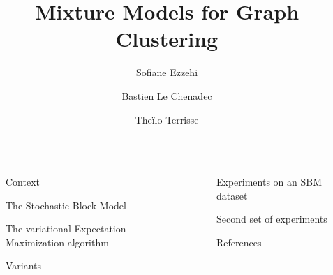 \documentclass[final]{beamer}
\title{Mixture Models for Graph Clustering}
\author{Sofiane Ezzehi \inst{1} \and Bastien Le Chenadec \inst{1} \and Theïlo Terrisse \inst{1}}
\institute[shortinst]{École des Ponts ParisTech}
\newlength{\sepwidth}
\newlength{\colwidth}
\newcommand{\separatorcolumn}{\begin{column}{\sepwidth}\end{column}}
\begin{document}
\begin{frame}[t]
  \begin{columns}[t]
    \separatorcolumn

    \begin{column}{\colwidth}

      \begin{block}{Context}
      \end{block}

      \begin{block}{The Stochastic Block Model}
      \end{block}

      \begin{alertblock}{The variational Expectation-Maximization algorithm}
      \end{alertblock}

      \begin{block}{Variants}

      \end{block}

    \end{column}

    \separatorcolumn

    \begin{column}{\colwidth}

      \begin{block}{Experiments on an SBM dataset}
      \end{block}

      \begin{block}{Second set of experiments}
      \end{block}

      \begin{block}{References}
        \nocite{*}
        \footnotesize{}
      \end{block}

    \end{column}

    \separatorcolumn

  \end{columns}
\end{frame}
\end{document}
